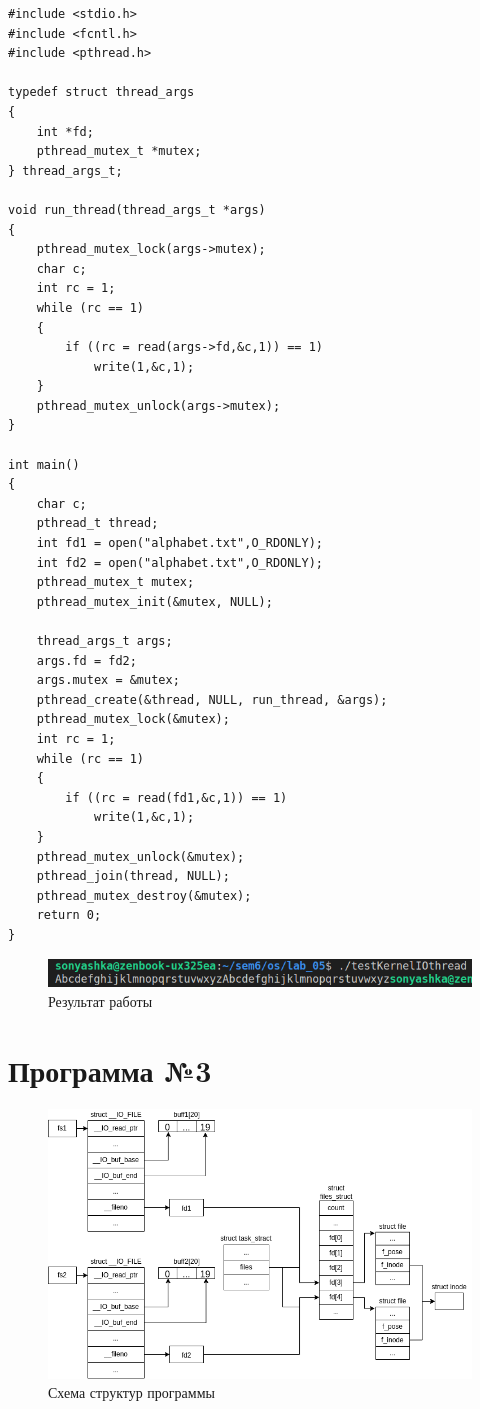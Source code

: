 \documentclass[14pt,a4paper]{scrreprt}
\begin{document}
\begin{lstlisting}[caption=Программа с дополнительным потоком]
#include <stdio.h>
#include <fcntl.h>
#include <pthread.h>

typedef struct thread_args
{
	int *fd;
	pthread_mutex_t *mutex;
} thread_args_t;

void run_thread(thread_args_t *args)
{
	pthread_mutex_lock(args->mutex);
	char c;
	int rc = 1;
	while (rc == 1)
	{
		if ((rc = read(args->fd,&c,1)) == 1)
			write(1,&c,1);
	}
	pthread_mutex_unlock(args->mutex);
}

int main()
{
	char c;    
	pthread_t thread;
	int fd1 = open("alphabet.txt",O_RDONLY);
	int fd2 = open("alphabet.txt",O_RDONLY);
	pthread_mutex_t mutex;
	pthread_mutex_init(&mutex, NULL);
	
	thread_args_t args;
	args.fd = fd2;
	args.mutex = &mutex;
	pthread_create(&thread, NULL, run_thread, &args);
	pthread_mutex_lock(&mutex);
	int rc = 1;
	while (rc == 1)
	{
		if ((rc = read(fd1,&c,1)) == 1)
			write(1,&c,1);
	}
	pthread_mutex_unlock(&mutex);
	pthread_join(thread, NULL);
	pthread_mutex_destroy(&mutex);
	return 0;
}
\end{lstlisting}

\begin{figure}[H]
	\begin{center}
		\includegraphics[scale=0.7]{assets/testKernelIOthread.png}
	\end{center}
	\caption{Результат работы}
\end{figure}

\chapter{Программа №3}

\begin{figure}[H]
	\begin{center}
		\includegraphics[scale=0.65]{assets/dtest.png}
	\end{center}
	\caption{Схема структур программы}
\end{figure}
\end{document}
